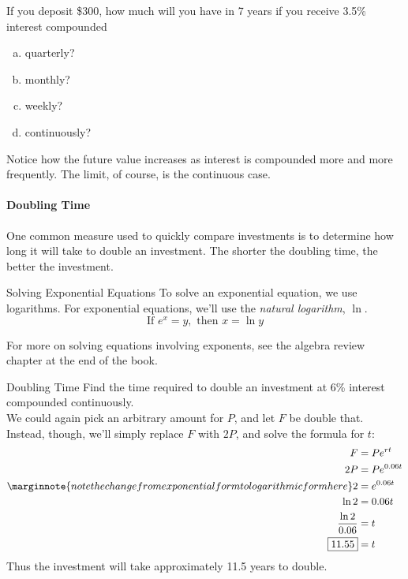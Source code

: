 \begin{try}
If you deposit \$300, how much will you have in 7 years if you receive 3.5\% interest compounded
\begin{enumerate}[(a)]
\item quarterly?
\item monthly?
\item weekly?
\item continuously?
\end{enumerate}
\end{try}

Notice how the future value increases as interest is compounded more and more frequently.  The limit, of course, is the continuous case.
\pagebreak

\paragraph{Doubling Time} One common measure used to quickly compare investments is to determine how long it will take to double an investment.  The shorter the doubling time, the better the investment.

\begin{proc}{Solving Exponential Equations}
To solve an exponential equation, we use logarithms.  For exponential equations, we'll use the \textit{natural logarithm}, $\ln$.
\[\textrm{If } e^x = y, \textrm{ then } x = \ln y\]
\end{proc}

For more on solving equations involving exponents, see the algebra review chapter at the end of the book.

\begin{example}{Doubling Time}
Find the time required to double an investment at 6\% interest compounded continuously.\\

\sol
We could again pick an arbitrary amount for $P$, and let $F$ be double that.  Instead, though, we'll simply replace $F$ with $2P$, and solve the formula for $t$:
\begin{align*}
F &= Pe^{rt}\\
2P &= Pe^{0.06t}\\
\marginnote{note the change from exponential form to logarithmic form here}
2 &= e^{0.06t}\\
\ln 2 &= 0.06t\\
\dfrac{\ln 2}{0.06} &= t\\
\boxed{11.55} &= t
\end{align*}
Thus the investment will take approximately 11.5 years to double.
\end{example}

